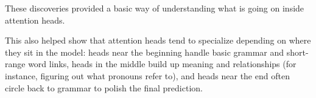 These discoveries provided a basic way of understanding what is going on inside attention heads. 

This also helped show that attention heads tend to specialize depending on where they sit in the model: heads near the beginning handle basic grammar and short-range word links, heads in the middle build up meaning and relationships (for instance, figuring out what pronouns refer to), and heads near the end often circle back to grammar to polish the final prediction.



%

